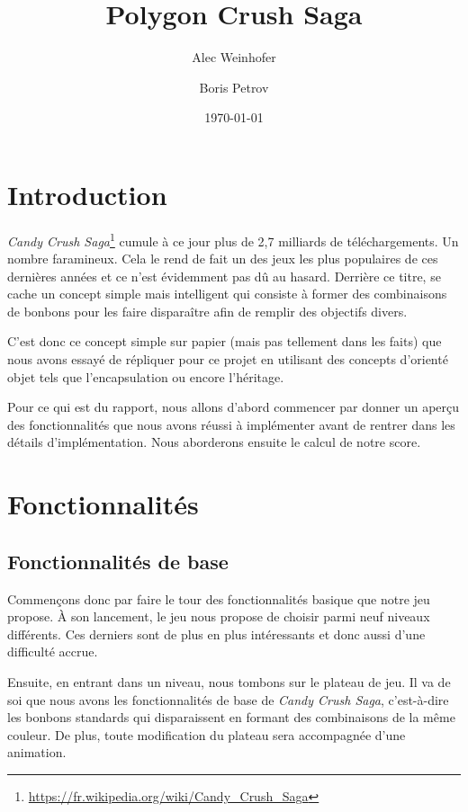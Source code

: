 \documentclass[11pt,a4paper]{article}
\title{Polygon Crush Saga}
\author{Alec Weinhofer \and Boris Petrov}
\date{\today}
\begin{document}
\maketitle
\tableofcontents


\section{Introduction}

\emph{Candy Crush Saga}\footnote{\url{https://fr.wikipedia.org/wiki/Candy_Crush_Saga}}
cumule à ce jour plus de 2,7 milliards de
téléchargements. Un nombre faramineux. Cela le rend de fait
un des jeux les plus populaires de ces dernières années et
ce n'est évidemment pas dû au hasard. Derrière ce titre, se
cache un concept simple mais intelligent qui consiste à
former des combinaisons de bonbons pour les faire
disparaître afin de remplir des objectifs divers.

C'est donc ce concept simple sur papier (mais pas tellement
dans les faits) que nous avons essayé de répliquer pour ce
projet en utilisant des concepts d'orienté objet tels que
l'encapsulation ou encore l'héritage.

Pour ce qui est du rapport, nous allons d'abord commencer par donner un aperçu des
fonctionnalités que nous avons réussi à implémenter avant de
rentrer dans les détails d'implémentation.
Nous aborderons ensuite le calcul de notre score.

\section{Fonctionnalités}

\subsection{Fonctionnalités de base}
Commençons donc par faire le tour des fonctionnalités basique que notre jeu propose.
À son lancement, le jeu nous propose de choisir parmi neuf niveaux différents.
Ces derniers sont de plus en plus intéressants et donc
aussi d'une difficulté accrue.

Ensuite, en entrant dans un niveau, nous tombons sur le plateau de jeu.
Il va de soi que nous avons les fonctionnalités de base de \emph{Candy Crush Saga},
c'est-à-dire les bonbons standards qui disparaissent en
formant des combinaisons de la même couleur. De plus, toute modification du plateau 
sera accompagnée d'une animation.
\end{document}
